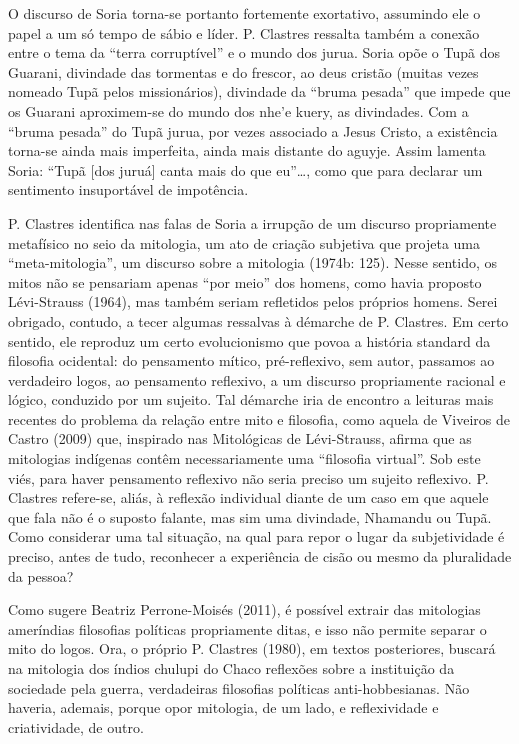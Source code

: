 O discurso de Soria torna-se portanto fortemente exortativo, assumindo
ele o papel a um só tempo de sábio e líder. P. Clastres ressalta também
a conexão entre o tema da ``terra corruptível'' e o mundo dos jurua.
Soria opõe o Tupã dos Guarani, divindade das tormentas e do frescor, ao
deus cristão (muitas vezes nomeado Tupã pelos missionários), divindade
da ``bruma pesada'' que impede que os Guarani aproximem-se do mundo dos
nhe’e kuery, as divindades. Com a ``bruma pesada'' do Tupã jurua, por
vezes associado a Jesus Cristo, a existência torna-se ainda mais
imperfeita, ainda mais distante do aguyje. Assim lamenta Soria: ``Tupã
[dos juruá] canta mais do que eu''\ldots{}, como que para declarar um
sentimento insuportável de impotência. 

P. Clastres identifica nas falas de Soria a irrupção de um discurso
propriamente metafísico no seio da mitologia, um ato de criação
subjetiva que projeta uma ``meta-mitologia'', um discurso sobre a
mitologia (1974b: 125). Nesse sentido, os mitos não se pensariam apenas
``por meio'' dos homens, como havia proposto Lévi-Strauss (1964), mas
também seriam refletidos pelos próprios homens. Serei obrigado,
contudo, a tecer algumas ressalvas à démarche de P. Clastres. Em certo
sentido, ele reproduz um certo evolucionismo que povoa a história
standard da filosofia ocidental: do pensamento mítico, pré-reflexivo,
sem autor, passamos ao verdadeiro logos, ao pensamento reflexivo, a um
discurso propriamente racional e lógico, conduzido por um sujeito. Tal
démarche iria de encontro a leituras mais recentes do problema da
relação entre mito e filosofia, como aquela de Viveiros de Castro
(2009) que, inspirado nas Mitológicas de Lévi-Strauss, afirma que as
mitologias indígenas contêm necessariamente uma ``filosofia virtual''.
Sob este viés, para haver pensamento reflexivo não seria preciso um
sujeito reflexivo. P. Clastres refere-se, aliás, à reflexão individual
diante de um caso em que aquele que fala não é o suposto falante, mas
sim uma divindade, Nhamandu ou Tupã. Como considerar uma tal situação,
na qual para repor o lugar da subjetividade é preciso, antes de tudo,
reconhecer a experiência de cisão ou mesmo da pluralidade da pessoa? 

Como sugere Beatriz Perrone-Moisés (2011), é possível extrair das
mitologias ameríndias filosofias políticas propriamente ditas, e isso
não permite separar o mito do logos. Ora, o próprio P. Clastres (1980),
em textos posteriores, buscará na mitologia dos índios chulupi do Chaco
reflexões sobre a instituição da sociedade pela guerra, verdadeiras
filosofias políticas anti-hobbesianas. Não haveria, ademais, porque
opor mitologia, de um lado, e reflexividade e criatividade, de outro. 

